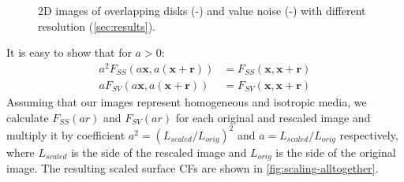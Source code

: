 \documentclass[reprint,amsmath,amssymb,aps,pre,showkeys,showpacs]{revtex4-1}
\begin{document}
\begin{figure}[!pt]
{    \label{fig:noise-4096}}
  \hfill
  \hfill
  \hfill
  \caption[]{2D images of overlapping disks
    (-) and value noise
    (-) with different resolution
    (\cref{sec:results}).}
  \label{fig:disks-noise}
\end{figure}

It is easy to show that for $a > 0$:
\begin{align}
  a^2 F_{SS}(a \mathbf{x}, a(\mathbf{x} + \mathbf{r})) &= F_{SS}(\mathbf{x},
  \mathbf{x} + \mathbf{r}) \label{eq:scale-ss} \\
  a F_{SV}(a \mathbf{x}, a(\mathbf{x} + \mathbf{r})) &= F_{SV}(\mathbf{x},
  \mathbf{x} + \mathbf{r}) \label{eq:scale-sv}
\end{align}
Assuming that our images represent homogeneous and isotropic media, we calculate
$F_{SS}(ar)$ and $F_{SV}(ar)$ for each original and rescaled image and multiply
it by coefficient $a^2 = (L_{scaled}/L_{orig})^2$ and $a = L_{scaled}/L_{orig}$
respectively, where $L_{scaled}$ is the side of the rescaled image and
$L_{orig}$ is the side of the original image. The resulting scaled surface CFs
are shown in \cref{fig:scaling-alltogether}.
\end{document}
